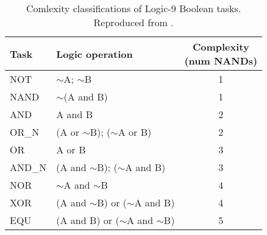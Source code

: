 \begin{table}[h]
\centering
\caption{Comlexity classifications of Logic-9 Boolean tasks. Reproduced from \citep{lenski2003evolutionary}.}
\label{tab:tasks}
\begin{tabular}{llc}
\hline
Task & Logic operation & \makecell{Complexity\\(num NANDs)} \\
\hline
NOT & $\sim$A; $\sim$B & 1 \\
NAND & $\sim$(A and B) & 1 \\
AND & A and B & 2 \\
OR\_N & (A or $\sim$B); ($\sim$A or B) & 2 \\
OR & A or B & 3 \\
AND\_N & (A and $\sim$B); ($\sim$A and B) & 3 \\
NOR & $\sim$A and $\sim$B & 4 \\
XOR & (A and $\sim$B) or ($\sim$A and B) & 4 \\
EQU & (A and B) or ($\sim$A and $\sim$B) & 5 \\
\hline
\end{tabular}
\end{table}
